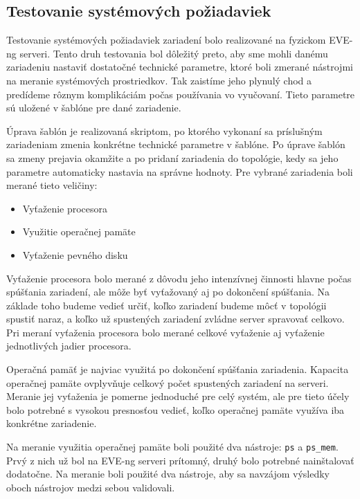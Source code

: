 \subsection{Testovanie systémových požiadaviek}
\label{chap:testovanie_zariadeni_benchmark}

Testovanie systémových požiadaviek zariadení bolo realizované na fyzickom EVE-ng serveri. Tento druh testovania bol dôležitý preto, aby sme mohli danému zariadeniu nastaviť dostatočné technické parametre, ktoré boli zmerané nástrojmi na meranie systémových prostriedkov. Tak zaistíme jeho plynulý chod a predídeme rôznym komplikáciám počas používania vo vyučovaní. Tieto parametre sú uložené v šablóne pre dané zariadenie.

Úprava šablón je realizovaná skriptom, po ktorého vykonaní sa príslušným zariadeniam zmenia konkrétne technické parametre v šablóne. Po úprave šablón sa zmeny prejavia okamžite a po pridaní zariadenia do topológie, kedy sa jeho parametre automaticky nastavia na správne hodnoty. Pre vybrané zariadenia boli merané tieto veličiny:

\begin{itemize}[noitemsep]
    \item Vyťaženie procesora
    \item Využitie operačnej pamäte
    \item Vyťaženie pevného disku
\end{itemize}

Vyťaženie procesora bolo merané z dôvodu jeho intenzívnej činnosti hlavne počas spúšťania zariadení, ale môže byť vyťažovaný aj po dokončení spúšťania. Na základe toho budeme vedieť určiť, koľko zariadení budeme môcť v topológii spustiť naraz, a koľko už spustených zariadení zvládne server spravovať celkovo. Pri meraní vyťaženia procesora bolo merané celkové vyťaženie aj vyťaženie jednotlivých jadier procesora.

Operačná pamäť je najviac využitá po dokončení spúšťania zariadenia. Kapacita operačnej pamäte ovplyvňuje celkový počet spustených zariadení na serveri. Meranie jej vyťaženia je pomerne jednoduché pre celý systém, ale pre tieto účely bolo potrebné s vysokou presnosťou vedieť, koľko operačnej pamäte využíva iba konkrétne zariadenie.

Na meranie využitia operačnej pamäte boli použité dva nástroje: \texttt{ps} a \texttt{ps\_mem}. Prvý z nich už bol na EVE-ng serveri prítomný, druhý bolo potrebné nainštalovať dodatočne. Na meranie boli použité dva nástroje, aby sa navzájom výsledky oboch nástrojov medzi sebou validovali.

